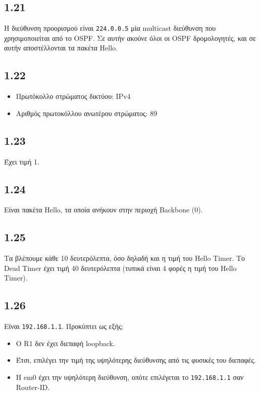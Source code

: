 \documentclass[a4paper, 12pt]{article}
\begin{document}
	\subsection*{1.21}
		Η διεύθυνση προορισμού είναι \verb|224.0.0.5| μία multicast διεύθυνση που χρησιμοποιείται από το OSPF. Σε αυτήν ακούνε όλοι οι OSPF δρομολογητές, και σε αυτήν αποστέλλονται τα πακέτα Hello.
	
	\subsection*{1.22}
	
	\begin{itemize}
		\item Πρωτόκολλο στρώματος δικτύου: IPv4
		\item Αριθμός πρωτοκόλλου ανωτέρου στρώματος: 89
	\end{itemize}

	\subsection*{1.23}
		Έχει τιμή 1.

	\subsection*{1.24}
		Είναι πακέτα Hello, τα οποία ανήκουν στην περιοχή Backbone (0).

	\subsection*{1.25}
		Τα βλέπουμε κάθε 10 δευτερόλεπτα, όσο δηλαδή και η τιμή του Hello Timer. Το Dead Timer έχει τιμή 40 δευτερόλεπτα (τυπικά είναι 4 φορές η τιμή του Hello Timer).

	\subsection*{1.26}
		Είναι \verb|192.168.1.1|. Προκύπτει ως εξής:
		
		\begin{itemize}
			\item Ο R1 δεν έχει διεπαφή loopback.
			\item Έτσι, επιλέγει την τιμή της υψηλότερης διεύθυνσης από τις φυσικές του διεπαφές.
			\item Η em0 έχει την υψηλότερη διεύθυνση, οπότε επιλέγεται το \verb|192.168.1.1| σαν Router-ID.
		\end{itemize}
\end{document}
